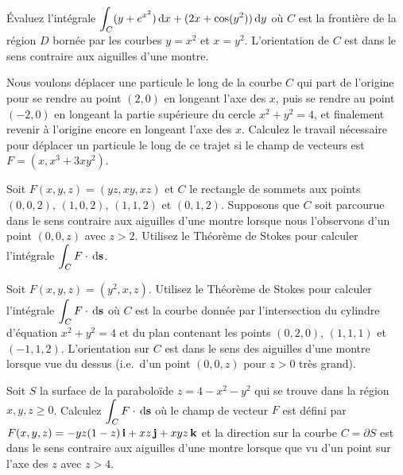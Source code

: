 \begin{question}
Évaluez l'intégrale
$\displaystyle \int_C(y+e^{x^2})\,\mathrm{d}x + (2x + \cos(y^2))\,\mathrm{d}y$
où $C$ est la frontière de la région $D$ bornée par les courbes
$y=x^2$ et $x = y^2$.  L'orientation de $C$ est dans le sens contraire
aux aiguilles d'une montre.
\label{17Q23}
\end{question}

\begin{question}
Nous voulons déplacer une particule le long de la courbe $C$ qui part de
l'origine pour se rendre au point $(2,0)$ en longeant l'axe des $x$,
puis se rendre au point $(-2,0)$ en longeant la partie supérieure du
cercle $x^2 + y^2 = 4$, et finalement revenir à l'origine encore en
longeant l'axe des $x$.  Calculez le travail nécessaire pour déplacer
un particule le long de ce trajet si le champ de vecteurs est
$F = (x, x^3 + 3 xy^2)$.
\label{17Q24}
\end{question}

\begin{question}
Soit $F(x,y,z) = (yz, xy, xz)$ et $C$ le rectangle de sommets
aux points $(0,0,2)$, $(1,0,2)$, $(1,1,2)$ et $(0,1,2)$.   Supposons
que $C$ soit parcourue dans le sens contraire aux aiguilles d'une
montre lorsque nous l'observons d'un point $(0,0,z)$ avec $z>2$.
Utilisez le Théorème de Stokes pour calculer l'intégrale
$\displaystyle \int_C F \cdot \,\mathrm{d}\mathbf{s}$.
\label{17Q25}
\end{question}

\begin{question}
Soit $F(x,y,z) = (y^2, x, z)$.  Utilisez le Théorème de Stokes
pour calculer l'intégrale
$\displaystyle \int_C F \cdot \,\mathrm{d}\mathbf{s}$
où $C$ est la courbe donnée par l'intersection du cylindre d'équation
$x^2 + y^2 =4$ et du plan contenant les points $(0,2,0)$, $(1,1,1)$ et
$(-1,1,2)$.  L'orientation sur $C$ est dans le sens des aiguilles
d'une montre lorsque vue du dessus (i.e.\ d'un point $(0,0,z)$ pour
$z>0$ très grand).
\label{17Q26}
\end{question}

\begin{question}
Soit $S$ la surface de la paraboloïde $z = 4 - x^2 - y^2$ qui se
trouve dans la région $x,y,z \geq 0$.  Calculez
$\displaystyle \int_C F \cdot \,\mathrm{d}\mathbf{s}$ où le champ de
vecteur $F$ est défini par
$F(x,y,z) = -yz(1-z) \, \mathbf{i} + xz \, \mathbf{j} + xyz \, \mathbf{k}$
et la direction sur la courbe $C = \partial S$ est dans le sens
contraire aux aiguilles d'une montre lorsque que vu d'un point sur
l'axe des $z$ avec $z > 4$.
\label{17Q27}
\end{question}

